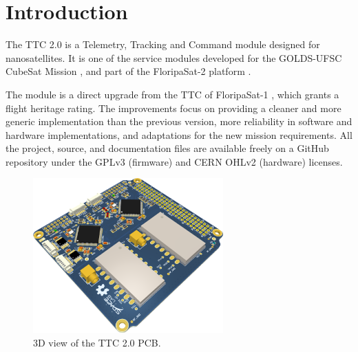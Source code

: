 %
%
%
%
%

%
%
%
%
%


\chapter{Introduction} \label{ch:introduction}

The TTC 2.0 is a Telemetry, Tracking and Command module designed for nanosatellites. It is one of the service modules developed for the GOLDS-UFSC CubeSat Mission \cite{floripasat2}, and part of the FloripaSat-2 platform \cite{marcelino2023}.

The module is a direct upgrade from the TTC of FloripaSat-1 \cite{ttc-fsat}, which grants a flight heritage rating. The improvements focus on providing a cleaner and more generic implementation than the previous version, more reliability in software and hardware implementations, and adaptations for the new mission requirements. All the project, source, and documentation files are available freely on a GitHub repository \cite{ttc2-repo} under the GPLv3 (firmware) and CERN OHLv2 (hardware) licenses.

\begin{figure}[!h]
	\begin{center}
		\includegraphics[width=0.65\textwidth]{figures/ttc2_pcb_3d.png}
		\caption{3D view of the TTC 2.0 PCB.}
		\label{fig:pcb-3d}
	\end{center}
\end{figure}


